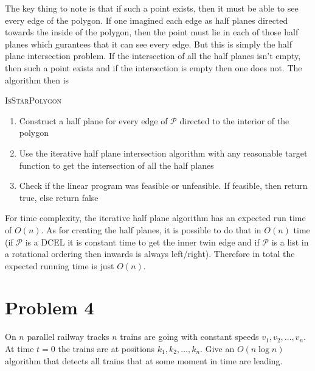 \documentclass[12pt]{extarticle}
\begin{document}
\begin{solution}
    The key thing to note is that if such a point exists, then it must be able to see every edge of the polygon. If one imagined each edge as half planes directed towards the inside of the polygon, then the point must lie in each of those half planes which gurantees that it can see every edge. But this is simply the half plane intersection problem. If the intersection of all the half planes isn't empty, then such a point exists and if the intersection is empty then one does not. The algorithm then is

    \begin{algorithm}[H]
        \caption{\textsc{IsStarPolygon}}
        \begin{enumerate}
            \item Construct a half plane for every edge of $\mathcal{P}$ directed to the interior of the polygon
            \item Use the iterative half plane intersection algorithm with any reasonable target function to get the intersection of all the half planes
            \item Check if the linear program was feasible or unfeasible. If feasible, then return true, else return false
        \end{enumerate}
    \end{algorithm}

    For time complexity, the iterative half plane algorithm has an expected run time of $O(n)$. As for creating the half planes, it is possible to do that in $O(n)$ time (if $\mathcal{P}$ is a DCEL it is constant time to get the inner twin edge and if $\mathcal{P}$ is a list in a rotational ordering then inwards is always left/right). Therefore in total the expected running time is just $O(n)$.
\end{solution}

\section*{Problem 4}
On $n$ parallel railway tracks $n$ trains are going with constant speeds $v_1, v_2, \ldots, v_n$. At time $t = 0$ the trains are at positions $k_1, k_2, \ldots , k_n$. Give an $O(n \log n)$ algorithm that detects all trains that at some moment in time are leading.
\end{document}
